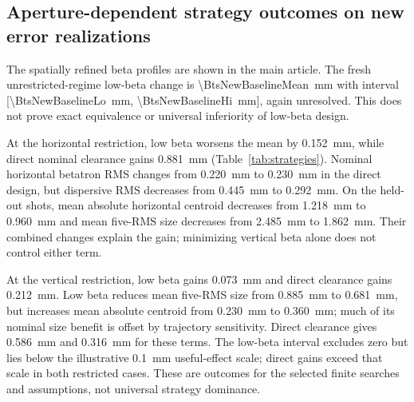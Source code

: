 \documentclass[10pt,a4paper]{article}
\begin{document}
\subsection{Aperture-dependent strategy outcomes on new error realizations}
The spatially refined beta profiles are shown in the main article.
The fresh unrestricted-regime low-beta change is \SI{\BtsNewBaselineMean}{\milli\metre} with interval
[\SI{\BtsNewBaselineLo}{\milli\metre}, \SI{\BtsNewBaselineHi}{\milli\metre}], again unresolved. This does not prove
exact equivalence or universal inferiority of low-beta design.



\begin{table}[htbp]\centering
\caption{Frozen-strategy comparisons. Nominal minimum and new paired mean change
are in \si{\milli\metre}; brackets give pointwise \SI{95}{\percent} realization-cluster intervals. Restricted
cases are hypothetical. The unrestricted-regime clearance-setting change is numerical.}
\label{tab:strategies}
\end{table}

At the horizontal restriction, low beta worsens the mean by \SI{0.152}{\milli\metre}, while
direct nominal clearance gains \SI{0.881}{\milli\metre} (Table~\ref{tab:strategies}). Nominal
horizontal betatron RMS changes from \SI{0.220}{\milli\metre} to \SI{0.230}{\milli\metre} in the direct design,
but dispersive RMS decreases from \SI{0.445}{\milli\metre} to \SI{0.292}{\milli\metre}. On the held-out shots,
mean absolute horizontal centroid decreases from \SI{1.218}{\milli\metre} to \SI{0.960}{\milli\metre} and mean
five-RMS size decreases from \SI{2.485}{\milli\metre} to \SI{1.862}{\milli\metre}. Their combined changes explain
the gain; minimizing vertical beta alone does not control either term.

At the vertical restriction, low beta gains \SI{0.073}{\milli\metre} and direct clearance gains
\SI{0.212}{\milli\metre}. Low beta reduces mean five-RMS size from \SI{0.885}{\milli\metre} to \SI{0.681}{\milli\metre}, but
increases mean absolute centroid from \SI{0.230}{\milli\metre} to \SI{0.360}{\milli\metre}; much of its nominal
size benefit is offset by trajectory sensitivity. Direct clearance gives
\SI{0.586}{\milli\metre} and \SI{0.316}{\milli\metre} for these terms. The low-beta interval excludes zero but
lies below the illustrative \SI{0.1}{\milli\metre} useful-effect scale; direct gains exceed
that scale in both restricted cases. These are outcomes for the selected finite
searches and assumptions, not universal strategy dominance.
\end{document}
